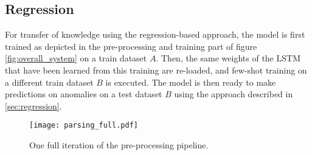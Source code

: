 \subsection{Regression \label{sec:transfer_regression}}
For transfer of knowledge using the regression-based approach, the model is first trained as depicted in the pre-processing and training part of figure \ref{fig:overall_system} on a train dataset $A$. Then, the same weights of the LSTM that have been learned from this training are re-loaded, and few-shot training on a different train dataset $B$ is executed. The model is then ready to make predictions on anomalies on a test dataset $B$ using the approach described in \ref{sec:regression}.



\begin{figure}[htb]
  \centering
  \texttt{[image: parsing\_full.pdf]}\\
  \caption{One full iteration of the pre-processing pipeline.}
  \label{fig:full_preprocessing_pipeline}
\end{figure}







